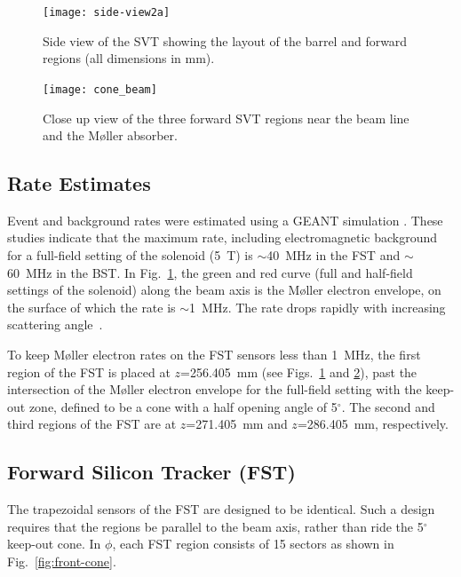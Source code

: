 \begin{figure}[htbp]
\centering
\texttt{[image: side-view2a]}
\caption{\small{Side view of the SVT showing the layout of the barrel and 
forward regions (all dimensions in mm).}}
\label{side-svt-layout}
\end{figure}

\begin{figure}[htbp]
\centering
\texttt{[image: cone\_beam]}
\caption{\small{Close up view of the three forward SVT regions near the beam 
line and the M{\o}ller absorber.}}
\label{cone_beam}
\end{figure}

\subsection{Rate Estimates}

Event and background rates were estimated using a GEANT simulation
\cite{CN2004-13,CN2006-20}.  These studies indicate that the maximum rate, 
including electromagnetic background for a full-field setting of the solenoid 
(5~T) is $\sim$40~MHz in the FST and $\sim$60~MHz in the BST.  In 
Fig.~\ref{side-svt-layout}, the green and red curve (full and half-field 
settings of the solenoid) along the beam axis is the M{\o}ller electron 
envelope, on the surface of which the rate is $\sim$1~MHz. The rate drops 
rapidly with increasing scattering angle~\cite{CN2006-20}.

To keep M{\o}ller electron rates on the FST sensors less than 1~MHz, the first 
region of the FST is placed at $z$=256.405~mm (see Figs.~\ref{side-svt-layout} 
and \ref{cone_beam}), past the intersection of the M{\o}ller electron envelope 
for the full-field setting with the keep-out zone, defined to be a cone with 
a half opening angle of 5$^\circ$.  The second and third regions of the FST 
are at $z$=271.405~mm and $z$=286.405~mm, respectively.

\subsection{Forward Silicon Tracker (FST)}

The trapezoidal sensors of the FST are designed to be identical.  Such a 
design requires that the regions be parallel to the beam axis, rather than 
ride the 5$^\circ$ keep-out cone.  In $\phi$, each FST region consists of 15 
sectors as shown in Fig.~\ref{fig:front-cone}.  

